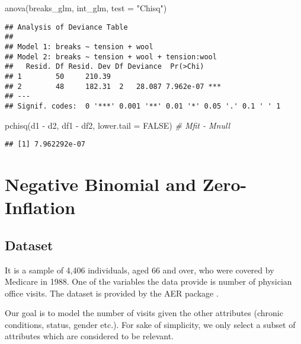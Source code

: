 \documentclass[
  oneside]{book}
\newenvironment{Shaded}{\begin{snugshade}}{\end{snugshade}}
\newcommand{\AttributeTok}[1]{\textcolor[rgb]{0.77,0.63,0.00}{#1}}
\newcommand{\CommentTok}[1]{\textcolor[rgb]{0.56,0.35,0.01}{\textit{#1}}}
\newcommand{\ConstantTok}[1]{\textcolor[rgb]{0.00,0.00,0.00}{#1}}
\newcommand{\FunctionTok}[1]{\textcolor[rgb]{0.00,0.00,0.00}{#1}}
\newcommand{\NormalTok}[1]{#1}
\newcommand{\SpecialCharTok}[1]{\textcolor[rgb]{0.00,0.00,0.00}{#1}}
\newcommand{\StringTok}[1]{\textcolor[rgb]{0.31,0.60,0.02}{#1}}
\begin{document}
\begin{Shaded}
\begin{Highlighting}[]
\FunctionTok{anova}\NormalTok{(breaks\_glm, int\_glm, }\AttributeTok{test =} \StringTok{"Chisq"}\NormalTok{)}
\end{Highlighting}
\end{Shaded}

\begin{verbatim}
## Analysis of Deviance Table
## 
## Model 1: breaks ~ tension + wool
## Model 2: breaks ~ tension + wool + tension:wool
##   Resid. Df Resid. Dev Df Deviance  Pr(>Chi)    
## 1        50     210.39                          
## 2        48     182.31  2   28.087 7.962e-07 ***
## ---
## Signif. codes:  0 '***' 0.001 '**' 0.01 '*' 0.05 '.' 0.1 ' ' 1
\end{verbatim}

\begin{Shaded}
\begin{Highlighting}[]
\FunctionTok{pchisq}\NormalTok{(d1 }\SpecialCharTok{{-}}\NormalTok{ d2, df1 }\SpecialCharTok{{-}}\NormalTok{ df2, }\AttributeTok{lower.tail =} \ConstantTok{FALSE}\NormalTok{) }\CommentTok{\# Mfit {-} Mnull}
\end{Highlighting}
\end{Shaded}

\begin{verbatim}
## [1] 7.962292e-07
\end{verbatim}

\hypertarget{negative-binomial-and-zero-inflation}{%
\chapter{Negative Binomial and Zero-Inflation}\label{negative-binomial-and-zero-inflation}}

\hypertarget{dataset}{%
\section{Dataset}\label{dataset}}

It is a sample of 4,406 individuals, aged 66 and over, who were covered by Medicare
in 1988. One of the variables the data provide is number of physician office visits.
The dataset is provided by the AER package \citep{aer}.

Our goal is to model the number of visits given the other attributes (chronic conditions,
status, gender etc.). For sake of simplicity, we only select a subset of attributes which
are considered to be relevant.
\end{document}
